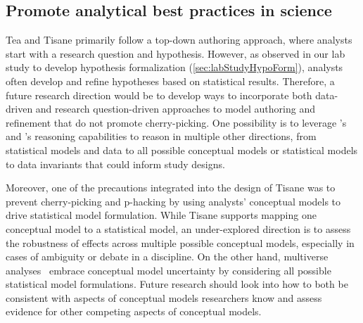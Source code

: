 \subsection{Promote analytical best practices in science}
Tea and Tisane primarily follow a top-down authoring approach, where analysts
start with a research question and hypothesis. However, as observed in our lab
study to develop hypothesis formalization (\autoref{sec:labStudyHypoForm}),
analysts often develop and refine hypotheses based on statistical results.
Therefore, a future research direction would be to develop ways to incorporate
both data-driven and research question-driven approaches to model authoring and
refinement that do not promote cherry-picking. One possibility is to leverage
\tea's and \tisane's reasoning capabilities to reason in multiple other
directions, from statistical models and data to all possible conceptual models
or statistical models to data invariants that could inform study designs.

Moreover, one of the precautions integrated into the design of Tisane was to prevent
cherry-picking and p-hacking by using analysts' conceptual models to drive
statistical model formulation. While Tisane supports mapping one conceptual
model to a statistical model, an under-explored direction is to assess the
robustness of effects across multiple possible conceptual models, especially in
cases of ambiguity or debate in a discipline. On the other hand, multiverse
analyses~\cite{} embrace conceptual model uncertainty by considering all
possible statistical model formulations. Future research should look into how to
both be consistent with aspects of conceptual models researchers know and assess
evidence for other competing aspects of conceptual models.


